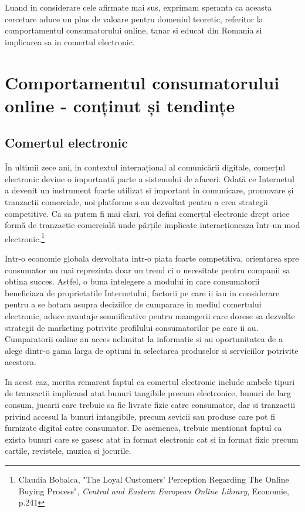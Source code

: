 \documentclass[a4paper, 12pt]{article}
\begin{document}
	\quad Luand in considerare cele afirmate mai sus, exprimam speranta ca aceasta cercetare aduce un plus de valoare pentru domeniul teoretic, referitor la comportamentul consumatorului online, tanar si educat din Romania si implicarea sa in comertul electronic.
		
\newpage
\setcounter{section}{0}
\section{ Comportamentul consumatorului online - conținut și tendințe}

\subsection{Comertul electronic}
\quad \quad\space În ultimii zece ani, in contextul internațional al comunicării digitale, comerțul electronic devine o importantă parte a sistemului de afaceri. Odată ce Internetul a devenit un instrument foarte utilizat si important în comunicare, promovare și tranzacții comerciale, noi platforme s-au dezvoltat pentru a crea strategii competitive. Ca sa putem fi mai clari, voi defini comerțul electronic drept orice formă de tranzacție comercială unde părțile implicate interacționeaza într-un mod electronic.\footnote{Claudia Bobalca, "The Loyal Customers’ Perception Regarding The Online
	Buying Process", \textit{Central and Eastern European Online Library}, Economie, p.241}

\quad 
Intr-o economie globala dezvoltata intr-o piata foarte competitiva, orientarea spre consumator nu mai reprezinta doar un trend ci o necesitate pentru companii sa obtina succes. Astfel, o buna intelegere a modului in care consumatorii beneficiaza de proprietatile Internetului, factorii pe care ii iau in considerare pentru a se hotara asupra deciziilor de cumparare in mediul comertului electronic, aduce avantaje semnificative pentru managerii care doresc sa dezvolte strategii de marketing potrivite profilului consumatorilor pe care ii au. Cumparatorii online au acces nelimitat la informatie si au oportunitatea de a alege dintr-o gama larga de optiuni in selectarea produselor si serviciilor potrivite acestora.

\quad In acest caz, merita remarcat faptul ca comertul electronic include ambele tipuri de tranzactii implicand atat bunuri tangibile precum electronice, bunuri de larg consum, jucarii care trebuie sa fie livrate fizic catre consumator, dar si tranzactii privind accesul la bunuri intangibile, precum sevicii sau produse care pot fi furnizate digital catre consumator. De asemenea, trebuie mentionat faptul ca exista bunuri care se gasesc atat in format electronic cat si in format fizic precum cartile, revistele, muzica si jocurile.
\end{document}
